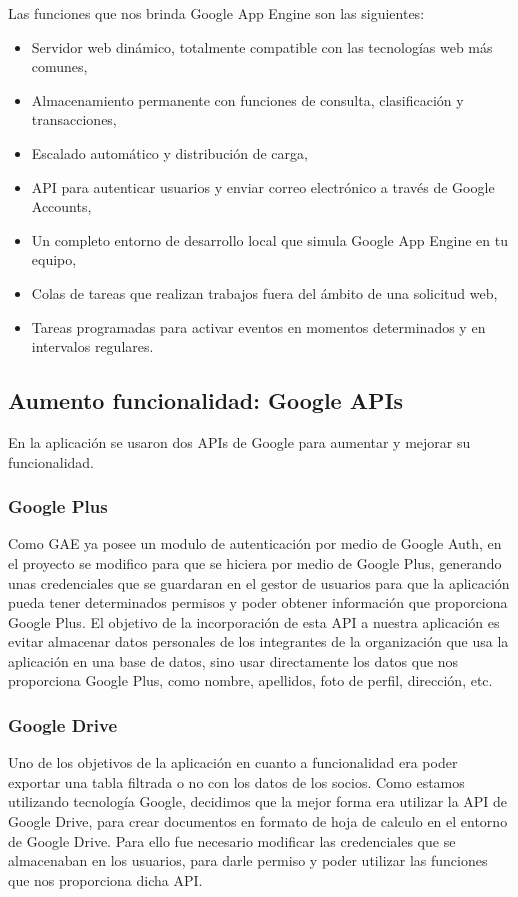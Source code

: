 Las funciones que nos brinda Google App Engine son las siguientes:

\begin{itemize}
  \item Servidor web dinámico, totalmente compatible con las tecnologías web más comunes,
  \item Almacenamiento permanente con funciones de consulta, clasificación y transacciones,
  \item Escalado automático y distribución de carga,
  \item API para autenticar usuarios y enviar correo electrónico a través de Google Accounts,
  \item Un completo entorno de desarrollo local que simula Google App Engine en tu equipo,
  \item Colas de tareas que realizan trabajos fuera del ámbito de una solicitud web,
  \item Tareas programadas para activar eventos en momentos determinados y en intervalos regulares.
\end{itemize}

\subsection{Aumento funcionalidad: Google APIs}


En la aplicación se usaron dos APIs de Google para aumentar y mejorar su funcionalidad. 


\subsubsection{Google Plus}
Como GAE ya posee un modulo de autenticación por medio de Google Auth,
en el proyecto se modifico para que se hiciera por medio de Google Plus, generando unas credenciales que se guardaran en el gestor de usuarios
para que la aplicación pueda tener determinados permisos y poder obtener información que proporciona Google Plus. El objetivo de la incorporación de esta 
API a nuestra aplicación es evitar almacenar datos personales de los integrantes de la organización que usa la aplicación en una base de datos, sino usar directamente los
datos que nos proporciona Google Plus, como nombre, apellidos, foto de perfil, dirección, etc.

\subsubsection{Google Drive}
Uno de los objetivos de la aplicación en cuanto a funcionalidad era poder exportar una tabla filtrada o no con los datos de los socios. Como estamos utilizando tecnología Google,
decidimos que la mejor forma era utilizar la API de Google Drive, para crear documentos en formato de hoja de calculo en el entorno de Google Drive. Para ello fue necesario
modificar las credenciales que se almacenaban en los usuarios, para darle permiso y poder utilizar las funciones que nos proporciona dicha API.


